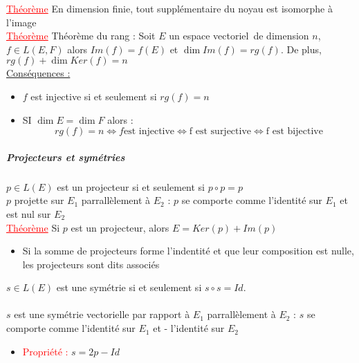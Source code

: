 \documentclass[a4paper, 11pts, french]{article}
\newcommand{\ev}{espace vectoriel}
\newcommand{\thm}{\textcolor{red}{\underline{Théorème} }}
\newcommand{\ppt}{\textcolor{red}{Propriété : }}
\begin{document}
	 \thm En dimension finie, tout supplémentaire du noyau est isomorphe à l'image \\
	 \thm Théorème du rang : Soit $E$ un \ev \, de dimension $n$, $f\in L(E,F)$ alors $Im(f)=f(E)$ et $\dim Im(f)=rg(f)$. De plus, $rg(f)+\dim Ker(f)=n$ \\
	 \underline{Conséquences :}
	\begin{itemize}
 		\item $f$ est injective si et seulement si $rg(f)=n$
 		\item SI $\dim E = \dim F$ alors :
				 $$rg(f)=n \iff f \text{est injective} \iff \text{f est surjective} \iff \text{f est bijective}$$
	\end{itemize}
	
	\subparagraph{Projecteurs et symétries \\}
	
	$p \in L(E)$ est un projecteur si et seulement si $p\circ p=p$ \\
	$p$ projette sur $E_1$ parrallèlement à $E_2$ : $p$ se comporte comme l'identité sur $E_1$ et est nul sur $E_2$ \\
	 \thm Si $p$ est un projecteur, alors $E=Ker(p)+Im(p)$
	
	 \begin{itemize}
 		\item Si la somme de projecteurs forme l'indentité et que leur composition est nulle, les projecteurs sont dits associés
	\end{itemize}

	$s \in L(E)$ est une symétrie si et seulement si $s\circ s=Id$.
	\paragraph*{}
	$s$ est une symétrie vectorielle par rapport à $E_1$ parrallèlement à $E_2$ : $s$ se comporte comme l'identité sur $E_1$ et - l'identité sur $E_2$ \\
	
	\begin{itemize}
 		\item\ppt $s=2p-Id$
	\end{itemize}
\end{document}
